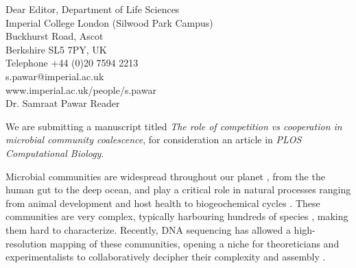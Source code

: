\documentclass[blank]{impletter}
\begin{document}
{
Dear Editor,
}
{Department of Life Sciences\\
Imperial College London (Silwood Park Campus)\\
Buckhurst Road, Ascot\\
Berkshire SL5 7PY, UK\\
Telephone +44 (0)20 7594 2213\\
s.pawar@imperial.ac.uk\\
www.imperial.ac.uk/people/s.pawar\\
}
{
Dr. Samraat Pawar
}
{
Reader\\
}
\informal



We are submitting a manuscript titled {\it The role of competition vs cooperation in microbial community coalescence}, for consideration an article in {\it PLOS Computational Biology}. 

Microbial communities are widespread throughout our planet \cite{Fierer2006}, from the the human gut to the deep ocean, and play a critical role in natural processes ranging from animal development and host health \cite{Huttenhower2012, McFall-Ngai2013} to biogeochemical cycles \cite{Falkowski2008}. These communities are very complex, typically harbouring hundreds of species \cite{Gilbert2014}, making them hard to characterize. Recently, DNA sequencing has allowed a high-resolution mapping of these communities, opening a niche for theoreticians and experimentalists to collaboratively decipher their complexity and assembly \cite{Costello2012,Friedman2017,Goldford2018,Goyal2018,Marsland2019,Vila2019,Estrela2020,Coyte2021,Fant2021}.
\end{document}
